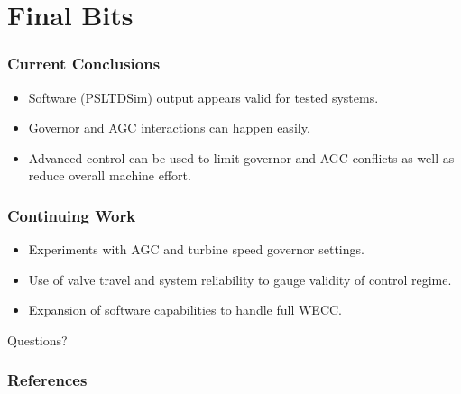 \documentclass[14pt, unknownkeysallowed]{beamer}
\begin{document}
\section{Final Bits}
\begin{frame}
\frametitle{Current Conclusions}
\begin{itemize}
	\item Software (PSLTDSim) output appears valid for tested systems.
	\item Governor and AGC interactions can happen easily.
	\item Advanced control can be used to limit governor and AGC conflicts as well as reduce overall machine effort.
\end{itemize}
\end{frame}
\begin{frame}
\frametitle{Continuing Work}
\begin{itemize}
\item Experiments with AGC and turbine speed governor settings.
\item Use of valve travel and system reliability to gauge validity of control regime.
\item Expansion of software capabilities to handle full WECC.
\end{itemize}
\end{frame}

\begin{frame}
\begin{center}
\Huge{Questions?}
\end{center}
\end{frame}

\begin{frame}[allowframebreaks]
\frametitle{References}
\renewcommand*{\bibfont}{\scriptsize} %
\printbibliography
\end{frame}
\end{document}
